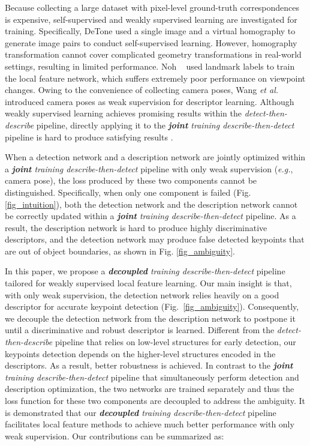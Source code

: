 \documentclass[10pt,twocolumn,letterpaper]{article}
\begin{document}
Because collecting a large dataset with  pixel-level ground-truth correspondences is expensive, self-supervised and weakly supervised learning are investigated for training. Specifically, DeTone \etal \cite{detone2018superpoint} used a single image and a virtual homography to generate image pairs to conduct self-supervised learning. However, homography transformation cannot cover complicated geometry transformations in real-world settings, resulting in limited performance. Noh \etal~\cite{noh2017large} used landmark labels to train the local feature network, which suffers extremely poor performance on viewpoint changes. Owing to the convenience of collecting camera poses, Wang \emph{et al.} \cite{wangLearningFeatureDescriptors2020} introduced camera poses as weak supervision for descriptor learning. Although weakly supervised learning achieves promising results within the \textit{detect-then-describe} pipeline, directly applying it to the \textit{\textbf{joint} training describe-then-detect} pipeline is hard to produce satisfying results \cite{tyszkiewiczDISKLearningLocal2020a}. 

When a detection network and a description network are jointly optimized within a \textit{\textbf{joint} training describe-then-detect} pipeline with only weak supervision (\emph{e.g.}, camera pose), the loss produced by these two components cannot be distinguished. Specifically, when only one component is failed (Fig. \ref{fig_intuition}), both the detection network and the description network cannot be correctly updated within a \textit{\textbf{joint} training describe-then-detect} pipeline. As a result, the description network is hard to produce highly discriminative descriptors, and the detection network may produce false detected keypoints that are out of object boundaries, as shown in Fig. \ref{fig_ambiguity}.

In this paper, we propose a \textit{\textbf{decoupled} training describe-then-detect} pipeline tailored for weakly supervised local feature learning. Our main insight is that, with only weak supervision, the detection network relies heavily on a good descriptor for accurate keypoint detection (Fig.~\ref{fig_ambiguity}). Consequently, we decouple the detection network from the description network to postpone it until a discriminative and robust descriptor is learned. Different from the \textit{detect-then-describe} pipeline that relies on low-level structures for early detection, our keypoints detection depends on the higher-level structures encoded in the descriptors. As a result, better robustness is achieved. In contrast to the \textit{\textbf{joint} training describe-then-detect} pipeline that simultaneously perform detection and description optimization, the two networks are trained separately and thus the loss function for these two components are decoupled to address the ambiguity. It is demonstrated that our \textit{\textbf{decoupled} training describe-then-detect} pipeline facilitates local feature methods to achieve much better performance with only weak supervision. Our contributions can be summarized as:
\end{document}
